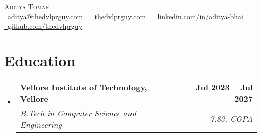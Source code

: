 \documentclass[a4paper,11pt]{article}
\makeatletter
\newcommand{\resumeSubheading}[4]{
  \vspace{-2pt}\item
    \begin{tabular*}{1.0\textwidth}[t]{l@{\extracolsep{\fill}}r}
      \textbf{#1} & \textbf{\small #2} \\
      \textit{\small#3} & \textit{\small #4} \\
    \end{tabular*}\vspace{-7pt}
}
\newcommand{\resumeSubHeadingListStart}{\begin{itemize}[leftmargin=0.0in, label={}]}
\newcommand{\resumeSubHeadingListEnd}{\end{itemize}}
\makeatother
\begin{document}

\begin{center}
    {\Huge \scshape Aditya Tomar} \\ \vspace{8pt}
    \small 
    \href{mailto:aarush@thedvlprguy.com}{\raisebox{-0.2\height}\faEnvelope\  \underline{aditya@thedvlprguy.com}} ~ 
    \href{https://thedvlprguy.com}{\raisebox{-0.2\height}\faLink\   \underline{thedvlprguy.com}} ~
    \href{https://linkedin.com/in/aarush-bhat/}{\raisebox{-0.2\height}\faLinkedin\ \underline{linkedin.com/in/aditya-bhai}}  ~
    \href{https://github.com/thedvlprguy}{\raisebox{-0.2\height}\faGithub\ \underline{github.com/thedvlprguy}}
    \vspace{-8pt}
\end{center}


\section{Education}
  \resumeSubHeadingListStart
    \resumeSubheading
      {Vellore Institute of Technology, Vellore}{Jul 2023 -- Jul 2027}
      {B.Tech in Computer Science and Engineering}{7.83, CGPA}
  \resumeSubHeadingListEnd
  
\end{document}
